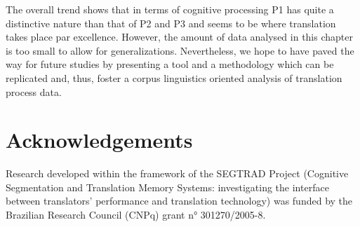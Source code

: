 \documentclass[output=paper]{LSP/langsci}
\begin{document}
The overall trend shows that in terms of cognitive processing P1 has quite a distinctive nature than that of P2 and P3 and seems to be where translation takes place par excellence. However, the amount of data analysed in this chapter is too small to allow for generalizations. Nevertheless, we hope to have paved the way for future studies by presenting a tool and a methodology which can be replicated and, thus, foster a corpus linguistics oriented analysis of translation process data. 

\section*{Acknowledgements}
Research developed within the framework of the SEGTRAD Project (Cognitive Segmentation and Translation Memory Systems: investigating the interface between translators' performance and translation technology)  was funded by the Brazilian Research Council (CNPq) grant n° 301270/2005-8.

{\sloppy 
\printbibliography[heading=subbibliography,notkeyword=this]
}
\end{document}
